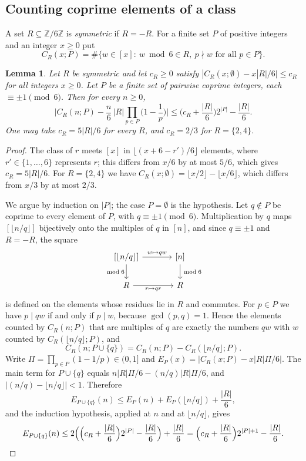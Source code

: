 \documentclass[11pt,a4paper]{article}
\newtheorem{lemma}[theorem]{Lemma}
\theoremstyle{definition}
\theoremstyle{remark}
\begin{document}
\subsection{Counting coprime elements of a class}

A set $R\subseteq\mathbb{Z}/6\mathbb{Z}$ is \emph{symmetric} if $R=-R$. For a finite set $P$ of
positive integers and an integer $x\ge0$ put
\[
  C_R(x;P)=\#\{w\in[x]:\ w\bmod 6\in R,\ p\nmid w\text{ for all }p\in P\}.
\]

\begin{lemma}\label{lem:count}
Let $R$ be symmetric and let $c_R\ge0$ satisfy $|C_R(x;\emptyset)-x|R|/6|\le c_R$ for all integers
$x\ge0$. Let $P$ be a finite set of pairwise coprime integers, each $\equiv\pm1\pmod 6$. Then for every
$n\ge0$,
\[
  \Big|C_R(n;P)-\frac n6\,|R|\prod_{p\in P}\Big(1-\frac1p\Big)\Big|
  \le\Big(c_R+\frac{|R|}6\Big)2^{|P|}-\frac{|R|}6 .
\]
One may take $c_R=5|R|/6$ for every $R$, and $c_R=2/3$ for $R=\{2,4\}$.
\end{lemma}

\begin{proof}
The class of $r$ meets $[x]$ in $\lfloor(x+6-r')/6\rfloor$ elements, where $r'\in\{1,\dots,6\}$
represents $r$; this differs from $x/6$ by at most $5/6$, which gives $c_R=5|R|/6$. For
$R=\{2,4\}$ we have $C_R(x;\emptyset)=\lfloor x/2\rfloor-\lfloor x/6\rfloor$, which differs from
$x/3$ by at most $2/3$.

We argue by induction on $|P|$; the case $P=\emptyset$ is the hypothesis. Let $q\notin P$ be coprime
to every element of $P$, with $q\equiv\pm1\pmod 6$. Multiplication by $q$ maps $[\lfloor
n/q\rfloor]$ bijectively onto the multiples of $q$ in $[n]$, and since $q\equiv\pm1$ and $R=-R$, the
square
\begin{equation}\label{cd:mult}
\begin{tikzcd}[column sep=large]
  {[\lfloor n/q\rfloor]} \arrow[r, "w\mapsto qw"] \arrow[d, "\bmod 6"'] & {[n]} \arrow[d, "\bmod 6"] \\
  R \arrow[r, "r\mapsto qr"'] & R
\end{tikzcd}
\end{equation}
is defined on the elements whose residues lie in $R$ and commutes. For $p\in P$ we have $p\mid qw$ if
and only if $p\mid w$, because $\gcd(p,q)=1$. Hence the elements counted by $C_R(n;P)$ that are
multiples of $q$ are exactly the numbers $qw$ with $w$ counted by $C_R(\lfloor n/q\rfloor;P)$, and
\[
  C_R(n;P\cup\{q\})=C_R(n;P)-C_R(\lfloor n/q\rfloor;P).
\]
Write $\Pi=\prod_{p\in P}(1-1/p)\in(0,1]$ and $E_P(x)=|C_R(x;P)-x|R|\Pi/6|$. The main term for
$P\cup\{q\}$ equals $n|R|\Pi/6-(n/q)|R|\Pi/6$, and $|(n/q)-\lfloor n/q\rfloor|<1$. Therefore
\[
  E_{P\cup\{q\}}(n)\le E_P(n)+E_P(\lfloor n/q\rfloor)+\frac{|R|}6 ,
\]
and the induction hypothesis, applied at $n$ and at $\lfloor n/q\rfloor$, gives
\[
  E_{P\cup\{q\}}(n)\le2\Big(\Big(c_R+\frac{|R|}6\Big)2^{|P|}-\frac{|R|}6\Big)+\frac{|R|}6
  =\Big(c_R+\frac{|R|}6\Big)2^{|P|+1}-\frac{|R|}6. \qedhere
\]
\end{proof}
\end{document}
